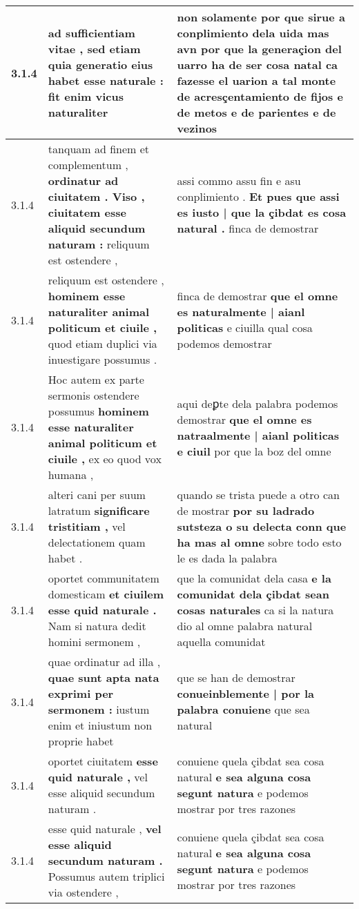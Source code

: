 \begin{tabular}{|p{1cm}|p{6.5cm}|p{6.5cm}|}
3.1.4 & ad sufficientiam vitae , \textbf{ sed etiam quia generatio eius habet esse naturale : } fit enim vicus naturaliter & non solamente por que sirue a conplimiento dela uida \textbf{ mas avn por que la generaçion del uarro ha de ser cosa natal } ca fazesse el uarion a tal monte de acresçentamiento de fijos e de metos e de parientes e de vezinos \\\hline
3.1.4 & tanquam ad finem et complementum , \textbf{ ordinatur ad ciuitatem . Viso , ciuitatem esse aliquid secundum naturam : } reliquum est ostendere , & assi commo assu fin e asu conplimiento . \textbf{ Et pues que assi es iusto | que la çibdat es cosa natural . } finca de demostrar \\\hline
3.1.4 & reliquum est ostendere , \textbf{ hominem esse naturaliter animal politicum et ciuile , } quod etiam duplici via inuestigare possumus . & finca de demostrar \textbf{ que el omne es naturalmente | aianl politicas } e ciuilla qual cosa podemos demostrar \\\hline
3.1.4 & Hoc autem ex parte sermonis ostendere possumus \textbf{ hominem esse naturaliter animal politicum et ciuile , } ex eo quod vox humana , & aqui deꝑte dela palabra podemos demostrar \textbf{ que el omne es natraalmente | aianl politicas e ciuil } por que la boz del omne \\\hline
3.1.4 & alteri cani per suum latratum \textbf{ significare tristitiam , } vel delectationem quam habet . & quando se trista puede a otro can de mostrar \textbf{ por su ladrado sutsteza o su delecta conn que ha mas al omne } sobre todo esto le es dada la palabra \\\hline
3.1.4 & oportet communitatem domesticam \textbf{ et ciuilem esse quid naturale . } Nam si natura dedit homini sermonem , & que la comunidat dela casa \textbf{ e la comunidat dela çibdat sean cosas naturales } ca si la natura dio al omne palabra natural aquella comunidat \\\hline
3.1.4 & quae ordinatur ad illa , \textbf{ quae sunt apta nata exprimi per sermonem : } iustum enim et iniustum non proprie habet & que se han de demostrar \textbf{ conueinblemente | por la palabra conuiene } que sea natural \\\hline
3.1.4 & oportet ciuitatem \textbf{ esse quid naturale , } vel esse aliquid secundum naturam . & conuiene quela çibdat sea cosa natural \textbf{ e sea alguna cosa segunt natura } e podemos mostrar por tres razones \\\hline
3.1.4 & esse quid naturale , \textbf{ vel esse aliquid secundum naturam . } Possumus autem triplici via ostendere , & conuiene quela çibdat sea cosa natural \textbf{ e sea alguna cosa segunt natura } e podemos mostrar por tres razones \\\hline

\end{tabular}
